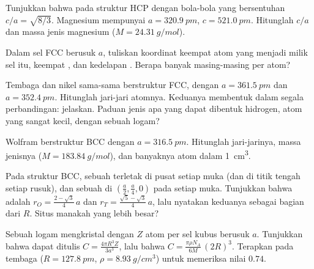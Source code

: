 \begin{exercise}[$\star\star$]\label{exo:b1:crystals-metals:6}
Tunjukkan bahwa pada struktur HCP dengan bola-bola yang bersentuhan
$c/a = \sqrt{8/3}$. Magnesium mempunyai $a = \qty{320.9}{pm}$,
$c = \qty{521.0}{pm}$. Hitunglah $c/a$ dan massa jenis magnesium
($M = \qty{24.31}{g/mol}$).
\end{exercise}

\begin{exercise}[$\star\star$]\label{exo:b1:crystals-metals:7}
Dalam sel FCC berusuk $a$, tuliskan koordinat keempat atom yang menjadi
milik sel itu, keempat , dan kedelapan .
Berapa banyak masing-masing per atom?
\end{exercise}

\begin{exercise}[$\star\star$]\label{exo:b1:crystals-metals:8}
Tembaga dan nikel sama-sama berstruktur FCC, dengan $a = \qty{361.5}{pm}$
dan $a = \qty{352.4}{pm}$. Hitunglah jari-jari atomnya. Keduanya membentuk
 dalam segala perbandingan: jelaskan. Paduan jenis apa
yang dapat dibentuk hidrogen, atom yang sangat kecil, dengan sebuah logam?
\end{exercise}

\begin{exercise}[$\star\star$]\label{exo:b1:crystals-metals:9}
Wolfram berstruktur BCC dengan $a = \qty{316.5}{pm}$. Hitunglah
jari-jarinya, massa jenisnya ($M = \qty{183.84}{g/mol}$), dan banyaknya
atom dalam \qty{1}{cm^3}.
\end{exercise}

\begin{exercise}[$\star\star\star$]\label{exo:b1:crystals-metals:10}
Pada struktur BCC, sebuah  terletak di pusat setiap muka
(dan di titik tengah setiap rusuk), dan sebuah  di
$(\frac{a}{2}, \frac{a}{4}, 0)$ pada setiap muka. Tunjukkan bahwa
 adalah $r_O = \frac{2 - \sqrt3}{4}\,a$ dan
$r_T = \frac{\sqrt5 - \sqrt3}{4}\,a$, lalu nyatakan keduanya sebagai
bagian dari $R$. Situs manakah yang lebih besar?
\end{exercise}

\begin{exercise}[$\star\star\star$]\label{exo:b1:crystals-metals:11}
Sebuah logam mengkristal dengan $Z$ atom per sel kubus berusuk $a$.
Tunjukkan bahwa  dapat ditulis $C = \frac{4\pi R^3 Z}{3a^3}$,
lalu bahwa $C = \frac{\pi\rho N_A}{6M}\,(2R)^3$. Terapkan pada tembaga
($R = \qty{127.8}{pm}$, $\rho = \qty{8.93}{g/cm^3}$) untuk memeriksa
nilai $0.74$.
\end{exercise}

